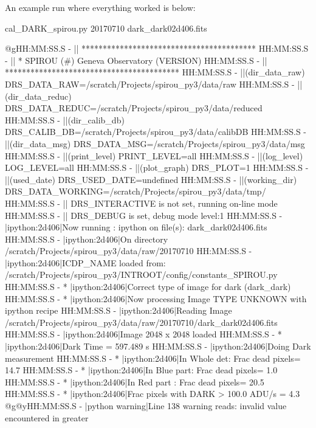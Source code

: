 An example run where everything worked is below:
\begin{cmdbox}[title={example}]
cal_DARK_spirou.py 20170710 dark_dark02d406.fits
\end{cmdbox}
\begin{cmdboxprintspecial}
@gHH:MM:SS.S -   || ***************************************** 
HH:MM:SS.S -   || * SPIROU \@(#) Geneva Observatory (VERSION) 
HH:MM:SS.S -   || ***************************************** 
HH:MM:SS.S -   ||(dir_data_raw)      DRS_DATA_RAW=/scratch/Projects/spirou_py3/data/raw 
HH:MM:SS.S -   ||(dir_data_reduc)    DRS_DATA_REDUC=/scratch/Projects/spirou_py3/data/reduced 
HH:MM:SS.S -   ||(dir_calib_db)      DRS_CALIB_DB=/scratch/Projects/spirou_py3/data/calibDB 
HH:MM:SS.S -   ||(dir_data_msg)      DRS_DATA_MSG=/scratch/Projects/spirou_py3/data/msg 
HH:MM:SS.S -   ||(print_level)       PRINT_LEVEL=all         %
HH:MM:SS.S -   ||(log_level)         LOG_LEVEL=all         %
HH:MM:SS.S -   ||(plot_graph)        DRS_PLOT=1            %
HH:MM:SS.S -   ||(used_date)         DRS_USED_DATE=undefined
HH:MM:SS.S -   ||(working_dir)       DRS_DATA_WORKING=/scratch/Projects/spirou_py3/data/tmp/
HH:MM:SS.S -   ||                    DRS_INTERACTIVE is not set, running on-line mode
HH:MM:SS.S -   ||                    DRS_DEBUG is set, debug mode level:1
HH:MM:SS.S -   |ipython:2d406|Now running : ipython on file(s): dark_dark02d406.fits
HH:MM:SS.S -   |ipython:2d406|On directory /scratch/Projects/spirou_py3/data/raw/20170710
HH:MM:SS.S -   |ipython:2d406|ICDP_NAME loaded from: /scratch/Projects/spirou_py3/INTROOT/config/constants_SPIROU.py
HH:MM:SS.S - * |ipython:2d406|Correct type of image for dark (dark_dark)
HH:MM:SS.S - * |ipython:2d406|Now processing Image TYPE UNKNOWN with ipython recipe
HH:MM:SS.S -   |ipython:2d406|Reading Image /scratch/Projects/spirou_py3/data/raw/20170710/dark_dark02d406.fits
HH:MM:SS.S -   |ipython:2d406|Image 2048 x 2048 loaded
HH:MM:SS.S - * |ipython:2d406|Dark Time = 597.489 s
HH:MM:SS.S -   |ipython:2d406|Doing Dark measurement
HH:MM:SS.S - * |ipython:2d406|In Whole det: Frac dead pixels= 14.7 %
HH:MM:SS.S - * |ipython:2d406|In Blue part: Frac dead pixels= 1.0 %
HH:MM:SS.S - * |ipython:2d406|In Red part : Frac dead pixels= 20.5 %
HH:MM:SS.S - * |ipython:2d406|Frac pixels with DARK > 100.0 ADU/s = 4.3 %
@g@yHH:MM:SS.S - \@ |python warning|Line 138 warning reads: invalid value encountered in greater

\end{cmdboxprintspecial}
